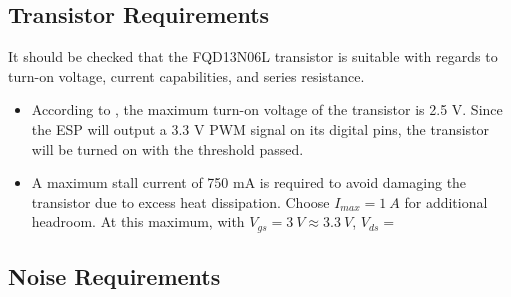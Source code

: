 \subsection{Transistor Requirements}

It should be checked that the FQD13N06L transistor is suitable with regards to turn-on voltage, current capabilities, and series resistance.
\begin{itemize}
    \item According to \cite{datasheetFQD13N06L}, the maximum turn-on voltage of the transistor is 2.5 V. Since the ESP will output a 3.3 V PWM signal on its digital pins,
    the transistor will be turned on with the threshold passed.
    \item A maximum stall current of 750 mA is required to avoid damaging the transistor due to excess heat dissipation. Choose $I_{max} = \SI{1}{A}$ for additional headroom.
          At this maximum, with $V_{gs} = \SI{3}{V} \approx \SI{3.3}{V}$, $V_{ds} = $
\end{itemize}

\subsection{Noise Requirements}

